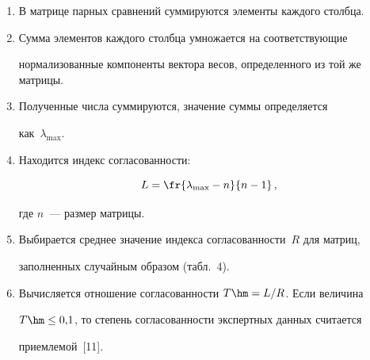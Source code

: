 \begin{table}[h]
\begin{minipage}[t]{27mm}
{%

}

\end{minipage}

\hfill

\begin{minipage}[t]{101mm}

           \begin{enumerate}[1.]

\item В матрице парных сравнений суммируются элементы каж\-дого столбца.

      \item Сумма элементов каждого столбца умножается на соответствующие 

нормализованные компоненты вектора весов, определенного из той же матрицы.

      \item Полученные числа суммируются, значение суммы определяется 

как~$\lambda_{\max}$.

      \item  Находится индекс согласованности:

      \begin{equation}

      L=\fr{\lambda_{\max}-n}{n-1}\,,

      \label{e3-zo}

      \end{equation}

где $n$~--- размер матрицы.

      \item  Выбирается среднее значение индекса согласованности~$R$ для матриц, 

заполненных случайным образом (табл.~4).

      



      \item Вычисляется отношение согласованности $T\hm= L/R$. Если величина 

$T\hm\leq 0{,}1$, то степень согласованности экспертных данных считается 

приемлемой~[11].

      \end{enumerate}

      \end{minipage}

      \end{table}

